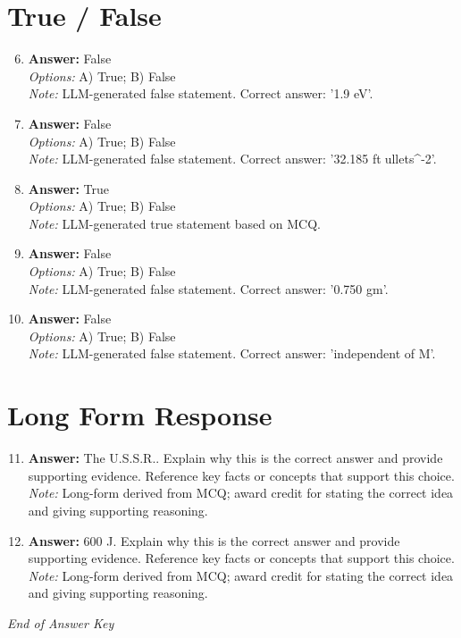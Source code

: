 \documentclass[12pt]{article}
\begin{document}
\section*{True / False}
\begin{enumerate}[label=\arabic*.]
\setcounter{enumi}{5}
\item \textbf{Answer:} False
\\ \textit{Options:} A) True; B) False
\\ \textit{Note:} LLM-generated false statement. Correct answer: '1.9 eV'.
\item \textbf{Answer:} False
\\ \textit{Options:} A) True; B) False
\\ \textit{Note:} LLM-generated false statement. Correct answer: '32.185 ftullets^-2'.
\item \textbf{Answer:} True
\\ \textit{Options:} A) True; B) False
\\ \textit{Note:} LLM-generated true statement based on MCQ.
\item \textbf{Answer:} False
\\ \textit{Options:} A) True; B) False
\\ \textit{Note:} LLM-generated false statement. Correct answer: '0.750 gm'.
\item \textbf{Answer:} False
\\ \textit{Options:} A) True; B) False
\\ \textit{Note:} LLM-generated false statement. Correct answer: 'independent of M'.
\end{enumerate}

\section*{Long Form Response}
\begin{enumerate}[label=\arabic*.]
\setcounter{enumi}{10}
\item \textbf{Answer:} The U.S.S.R.. Explain why this is the correct answer and provide supporting evidence. Reference key facts or concepts that support this choice.
\\ \textit{Note:} Long-form derived from MCQ; award credit for stating the correct idea and giving supporting reasoning.
\item \textbf{Answer:} 600 J. Explain why this is the correct answer and provide supporting evidence. Reference key facts or concepts that support this choice.
\\ \textit{Note:} Long-form derived from MCQ; award credit for stating the correct idea and giving supporting reasoning.
\end{enumerate}

\vfill
\noindent\textit{End of Answer Key}
\end{document}
